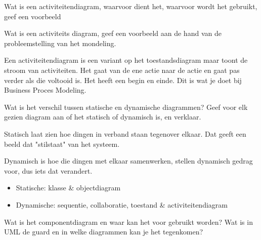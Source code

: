 \begin{question}
Wat is een activiteitendiagram, waarvoor dient het, waarvoor wordt het gebruikt, geef een voorbeeld
\end{question}

\begin{solution}[print]

\end{solution}

\begin{question}
Wat is een activiteits diagram, geef een voorbeeld aan de hand van de probleemstelling van het mondeling.
\end{question}

\begin{solution}[print]
Een activiteitendiagram is een variant op het toestandsdiagram maar toont de stroom van activiteiten. Het gaat van de ene actie naar de actie en gaat pas verder als die voltooid is. Het heeft een begin en einde. Dit is wat je doet bij Business Proces Modeling.
\end{solution}

\begin{question}
Wat is het verschil tussen statische en dynamische diagrammen? Geef voor elk gezien diagram aan of het statisch of dynamisch is, en verklaar.
\end{question}

\begin{solution}[print]
Statisch laat zien hoe dingen in verband staan tegenover elkaar. Dat geeft een beeld dat "stilstaat" van het systeem.

Dynamisch is hoe die dingen met elkaar samenwerken, stellen dynamisch gedrag voor, dus iets dat verandert.

\begin{itemize}
\bfsp
    \item Statische: klasse \& objectdiagram
    \item Dynamische: sequentie, collaboratie, toestand \& activiteitendiagram
\end{itemize}

\end{solution}

\begin{question}
Wat is het componentdiagram en waar kan het voor gebruikt worden? Wat is in UML de guard en in welke diagrammen kan je het tegenkomen?
\end{question}

